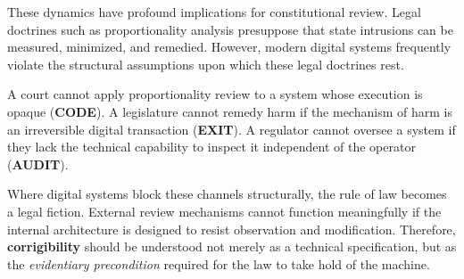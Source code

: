 These dynamics have profound implications for constitutional review. Legal doctrines such as proportionality analysis presuppose that state intrusions can be measured, minimized, and remedied. However, modern digital systems frequently violate the structural assumptions upon which these legal doctrines rest.

A court cannot apply proportionality review to a system whose execution is opaque (\textbf{CODE}). A legislature cannot remedy harm if the mechanism of harm is an irreversible digital transaction (\textbf{EXIT}). A regulator cannot oversee a system if they lack the technical capability to inspect it independent of the operator (\textbf{AUDIT}).

Where digital systems block these channels structurally, the rule of law becomes a legal fiction. External review mechanisms cannot function meaningfully if the internal architecture is designed to resist observation and modification. Therefore, \textbf{corrigibility} should be understood not merely as a technical specification, but as the \textit{evidentiary precondition} required for the law to take hold of the machine.